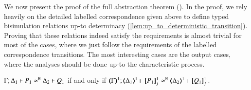 

We now present the proof of the full abstraction theorem ().
In the proof, we rely heavily on the detailed labelled correspondence given above to define 
typed bisimulation relations up-to determinacy (\ref{lem:up_to_deterministic_transition}). 
Proving that these relations indeed satisfy the requirements is almost
trivial for most of the cases, where we just follow the requirements of the labelled correspondence transitions.
The most interesting cases are the output cases, where the analyses should be done up-to the characteristic process.


\begin{proposition}\rm
	\label{app:prop:fulla_HOp_to_HO}
	$\Gamma; \Delta_1 \vdash P_1 \approx^\mathtt{H} \Delta_2 \vdash Q_1$
	if and only if
	$\horel{\tmap{\Gamma}{1}}{\tmap{\Delta_1}{1}}{\pmapp{P_1}{1}{f}}{\hwb}{\tmap{\Delta_2}{1}}{\pmapp{Q_1}{1}{f}}$.
\end{proposition}


